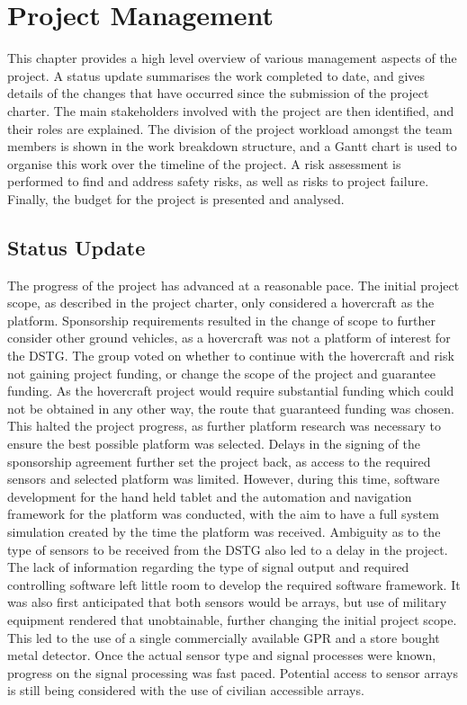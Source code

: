 \documentclass[main.tex]{subfiles}
\begin{document}
\chapter{Project Management}
This chapter provides a high level overview of various management aspects of the project. A status update summarises the work completed to date, and gives details of the changes that have occurred since the submission of the project charter. The main stakeholders involved with the project are then identified, and their roles are explained. The division of the project workload amongst the team members is shown in the work breakdown structure, and a Gantt chart is used to organise this work over the timeline of the project. A risk assessment is performed to find and address safety risks, as well as risks to project failure. Finally, the budget for the project is presented and analysed.  

\section{Status Update}
The progress of the project has advanced at a reasonable pace. The initial project scope, as described in the project charter, only considered a hovercraft as the platform. Sponsorship requirements resulted in the change of scope to further consider other ground vehicles, as a hovercraft was not a platform of interest for the DSTG. The group voted on whether to continue with the hovercraft and risk not gaining project funding, or change the scope of the project and guarantee funding. As the hovercraft project would require substantial funding which could not be obtained in any other way, the route that guaranteed funding was chosen. This halted the project progress, as further platform research was necessary to ensure the best possible platform was selected. Delays in the signing of the sponsorship agreement further set the project back, as access to the required sensors and selected platform was limited. However, during this time, software development for the hand held tablet and the automation and navigation framework for the platform was conducted, with the aim to have a full system simulation created by the time the platform was received. Ambiguity as to the type of sensors to be received from the DSTG also led to a delay in the project. The lack of information regarding the type of signal output and required controlling software left little room to develop the required software framework. It was also first anticipated that both sensors would be arrays, but use of military equipment rendered that unobtainable, further changing the initial project scope. This led to the use of a single commercially available GPR and a store bought metal detector. Once the actual sensor type and signal processes were known, progress on the signal processing was fast paced. Potential access to sensor arrays is still being considered with the use of civilian accessible arrays.      
\end{document}
